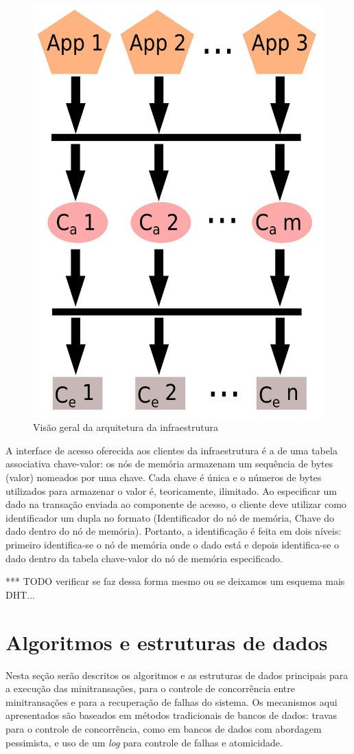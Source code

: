 \documentclass[11pt,twoside,a4paper]{book}
\begin{document}
\begin{figure}
  \centering
  \includegraphics[width=.40\textwidth]{overview_arquitetura} 
  \caption{Visão geral da arquitetura da infraestrutura}
  \label{fig:overview_arquitetura} 
\end{figure}

A interface de acesso oferecida aos clientes da infraestrutura é a de uma tabela associativa chave-valor: os nós de memória armazenam um sequência de bytes (valor) nomeados por uma chave. Cada chave é única e o números de bytes utilizados para armazenar o valor é, teoricamente, ilimitado. Ao especificar um dado na transação enviada ao componente de acesso, o cliente deve utilizar como identificador um dupla no formato (Identificador do nó de memória, Chave do dado dentro do nó de memória). Portanto, a identificação é feita em dois níveis: primeiro identifica-se o nó de memória onde o dado está e depois identifica-se o dado dentro da tabela chave-valor do nó de memória especificado.

*** TODO verificar se faz dessa forma mesmo ou se deixamos um esquema mais DHT...

\section{Algoritmos e estruturas de dados}
\label{sec:algoritmos}
Nesta seção serão descritos os algoritmos e as estruturas de dados principais para a execução das minitransações, para o controle de concorrência entre minitransações e para a recuperação de falhas do sistema. Os mecanismos aqui apresentados são baseados em métodos tradicionais de bancos de dados: travas para o controle de concorrência, como em bancos de dados com abordagem pessimista, e uso de um \emph{log} para controle de falhas e atomicidade.
\end{document}
